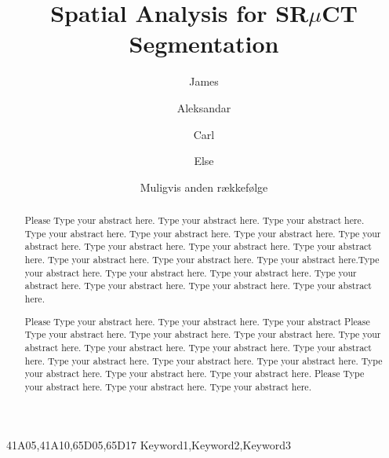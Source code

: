 \documentclass[times,twocolumn,final]{elsarticle}
\begin{document}

\begin{frontmatter}

\title{Spatial Analysis for SR$\mu$CT Segmentation}%

\author[1]{James }
\author[3]{Aleksandar }
\author[1]{Carl }
\author[4]{Else }
\author{Muligvis anden rækkefølge}

\address[1]{University of Copenhagen, Department of Computer Science}
\address[2]{University of Copenhagen, Niels Bohr Institute}
\address[3]{Qtechnology A/S}
\address[4]{University of Southern Denmark}



\begin{abstract}
Please Type your abstract here. Type your abstract here. Type your abstract
here. Type your abstract here. Type your abstract here. Type your
abstract here. Type your abstract here. Type your abstract here. Type
your abstract here. Type your abstract here. Type your abstract here.
Type your abstract here. Type your abstract here.Type your abstract here. 
Type your abstract here. Type your abstract here. Type your abstract here. 
Type your abstract here. Type your abstract here. Type your abstract here.

Please Type your abstract here. Type your abstract here. Type your abstract
Please Type your abstract here. Type your abstract here. Type your abstract
here. Type your abstract here. Type your abstract here. Type your
abstract here. Type your abstract here. Type your abstract here. Type
your abstract here. Type your abstract here. Type your abstract here.
Type your abstract here. Type your abstract here.
Please Type your abstract here. Type your abstract here. 
Type your abstract here.
\end{abstract}

\begin{keyword}
\MSC 41A05\sep 41A10\sep 65D05\sep 65D17
\KWD Keyword1\sep Keyword2\sep Keyword3
\end{keyword}

\end{frontmatter}
\end{document}

